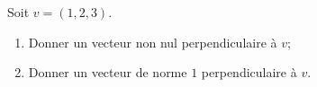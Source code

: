 
\begin{exercice}\label{exoOutilsMath-0047}

    Soit $v=(1,2,3)$.
    \begin{enumerate}
        \item
            Donner un vecteur non nul perpendiculaire à $v$;
        \item
            Donner un vecteur de norme $1$ perpendiculaire à $v$.
    \end{enumerate}

\end{exercice}
